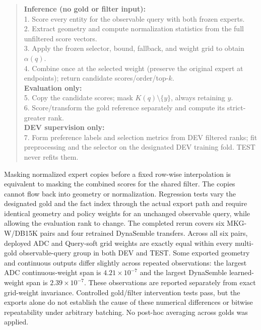 \documentclass[11pt,a4paper]{article}
\begin{document}
\begin{quote}\small
\textbf{Inference (no gold or filter input):}\\
1. Score every entity for the observable query with both frozen experts.\\
2. Extract geometry and compute normalization statistics from the full unfiltered score vectors.\\
3. Apply the frozen selector, bound, fallback, and weight grid to obtain $\alpha(q)$.\\
4. Combine once at the selected weight (preserve the original expert at endpoints); return candidate scores/order/top-$k$.\\[3pt]
\textbf{Evaluation only:}\\
5. Copy the candidate scores; mask $K(q)\setminus\{y\}$, always retaining $y$.\\
6. Score/transform the gold reference separately and compute its strict-greater rank.\\[3pt]
\textbf{DEV supervision only:}\\
7. Form preference labels and selection metrics from DEV filtered ranks; fit preprocessing and the selector on the designated DEV training fold. TEST never refits them.
\end{quote}
Masking normalized expert copies before a fixed row-wise interpolation is equivalent to masking the combined scores for the shared filter. The copies cannot flow back into geometry or normalization. Regression tests vary the designated gold and the fact index through the actual export path and require identical geometry and policy weights for an unchanged observable query, while allowing the evaluation rank to change. The completed rerun covers six MKG-W/DB15K pairs and four retrained DynaSemble transfers. Across all six pairs, deployed ADC and Query-soft grid weights are exactly equal within every multi-gold observable-query group in both DEV and TEST. Some exported geometry and continuous outputs differ slightly across repeated observations: the largest ADC continuous-weight span is $4.21\times10^{-7}$ and the largest DynaSemble learned-weight span is $2.39\times10^{-7}$. These observations are reported separately from exact grid-weight invariance. Controlled gold/filter intervention tests pass, but the exports alone do not establish the cause of these numerical differences or bitwise repeatability under arbitrary batching. No post-hoc averaging across golds was applied.
\end{document}
